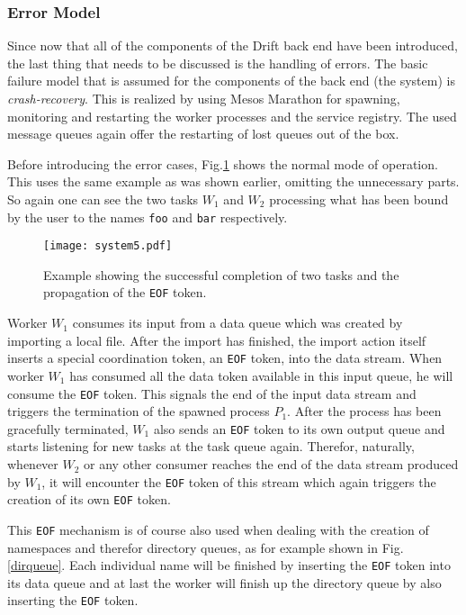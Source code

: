 \subsubsection{Error Model}
\label{errormodel}

Since now that all of the components of the Drift back end have
been introduced, the last thing that needs to be discussed is
the handling of errors. The basic failure model that is assumed
for the components of the back end (the system) is
\textit{crash-recovery}. This is realized by using Mesos Marathon
for spawning, monitoring and restarting the worker processes and
the service registry. The used message queues again offer the
restarting of lost queues out of the box.

Before introducing the error cases, Fig.\ref{system5} shows
the normal mode of operation. This uses the same example as
was shown earlier, omitting the unnecessary parts. So again
one can see the two tasks $W_{1}$ and $W_{2}$ processing
what has been bound by the user to the names \texttt{foo} and
\texttt{bar} respectively.

\begin{figure}[h]
  \texttt{[image: system5.pdf]}
  \caption{Example showing the successful completion of two
           tasks and the propagation of the \texttt{EOF} token.}
  \label{system5}
\end{figure}

Worker $W_{1}$ consumes its input from a data queue which was
created by importing a local file. After the import has finished,
the import action itself inserts a special coordination token,
an \texttt{EOF} token, into the data stream. When worker
$W_{1}$ has consumed all the data token available in this
input queue, he will consume the \texttt{EOF} token. This
signals the end of the input data stream and triggers the
termination of the spawned process $P_{1}$. After the process has
been gracefully terminated, $W_{1}$ also sends an \texttt{EOF}
token to its own output queue and starts listening for new
tasks at the task queue again. Therefor, naturally, whenever
$W_{2}$ or any other consumer reaches the end of the data
stream produced by $W_{1}$, it will encounter the \texttt{EOF}
token of this stream which again triggers the creation
of its own \texttt{EOF} token.

This \texttt{EOF} mechanism is of course also used when
dealing with the creation of namespaces and therefor
directory queues, as for example shown in Fig.\ref{dirqueue}.
Each individual name will be finished by inserting the \texttt{EOF}
token into its data queue and at last the worker will finish
up the directory queue by also inserting the \texttt{EOF} token.
\newline

